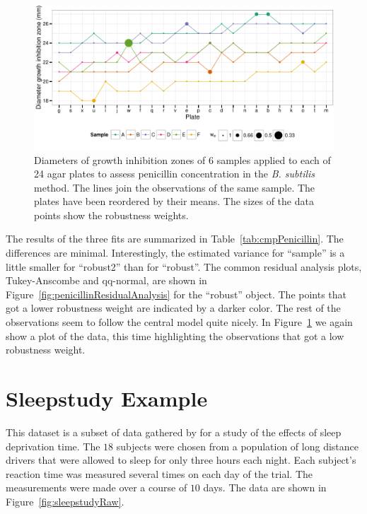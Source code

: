 \documentclass[11pt, a4paper]{article}
\theoremstyle{note}
\begin{document}
\begin{figure}[htb]
  \centering
  \includegraphics{figs/fig-ex-penicillin-robustness-weights}
  \caption{Diameters of growth inhibition zones of 6 samples applied to
    each of 24 agar plates to assess penicillin concentration in the
    \emph{B. subtilis} method. The lines join the observations of the same
    sample. The plates have been reordered by their means. The sizes of the
    data points show the robustness weights.}
  \label{fig:penicillinRobustnessWeights}
\end{figure}

The results of the three fits are summarized in
Table~\ref{tab:cmpPenicillin}. The differences are minimal. Interestingly,
the estimated variance for ``sample'' is a little smaller for ``robust2''
than for ``robust''. The common residual analysis plots, Tukey-Anscombe
and qq-normal, are shown in Figure~\ref{fig:penicillinResidualAnalysis} for
the ``robust'' object. The points that got a lower robustness weight are
indicated by a darker color. The rest of the observations seem to follow
the central model quite nicely. In Figure~\ref{fig:penicillinRobustnessWeights}
we again show a plot of the data, this time highlighting the observations
that got a low robustness weight.

\section{Sleepstudy Example}
\label{sec:sleepstudy}

This dataset is a subset of data gathered by \citet{belenky03sleepstudy}
for a study of the effects of sleep deprivation time. The $18$ subjects
were chosen from a population of long distance drivers that were allowed to
sleep for only three hours each night. Each subject's reaction time was
measured several times on each day of the trial. The measurements were made
over a course of $10$ days. The data are shown in
Figure~\ref{fig:sleepstudyRaw}.
\end{document}
